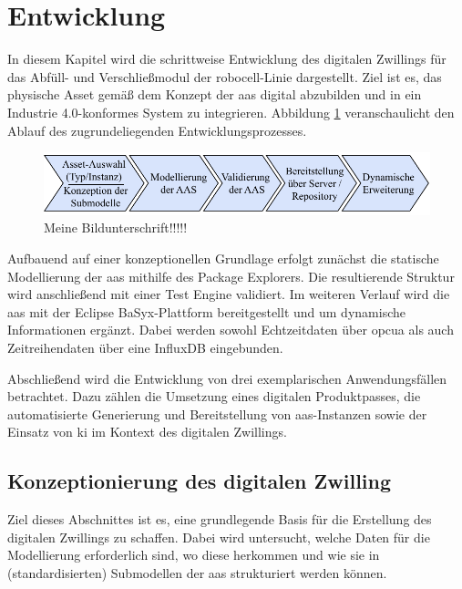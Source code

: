 \newpage
\section{Entwicklung}
In diesem Kapitel wird die schrittweise Entwicklung des digitalen Zwillings für das Abfüll- und Verschließmodul der robocell-Linie dargestellt.
Ziel ist es, das physische Asset gemäß dem Konzept der \acs{aas} digital abzubilden und in ein Industrie 4.0-konformes System zu integrieren.
Abbildung \ref{fig:Entwicklungsschritte} veranschaulicht den Ablauf des zugrundeliegenden Entwicklungsprozesses.

\begin{figure}[htbp]
    \centering
    \includegraphics[width=1\textwidth]{Bilder/vorgehenEntwicklungsteil.pdf}
    \caption{Meine Bildunterschrift!!!!!}
    \label{fig:Entwicklungsschritte}
\end{figure}
\vspace{-1em}

Aufbauend auf einer konzeptionellen Grundlage erfolgt zunächst die statische Modellierung der \acs{aas} mithilfe des Package Explorers. 
Die resultierende Struktur wird anschließend mit einer Test Engine validiert.
Im weiteren Verlauf wird die \acs{aas} mit der Eclipse BaSyx-Plattform bereitgestellt und um dynamische Informationen ergänzt. 
Dabei werden sowohl Echtzeitdaten über \acs{opcua} als auch Zeitreihendaten über eine InfluxDB eingebunden.

Abschließend wird die Entwicklung von drei exemplarischen Anwendungsfällen betrachtet. 
Dazu zählen die Umsetzung eines digitalen Produktpasses, die automatisierte Generierung und Bereitstellung von \acs{aas}-Instanzen sowie der Einsatz von \acs{ki} im Kontext des digitalen Zwillings.

\subsection{Konzeptionierung des digitalen Zwilling}
Ziel dieses Abschnittes ist es, eine grundlegende Basis für die Erstellung des digitalen Zwillings zu schaffen.
Dabei wird untersucht, welche Daten für die Modellierung erforderlich sind, wo diese herkommen und wie sie in (standardisierten) Submodellen der \acs{aas} strukturiert werden können.
